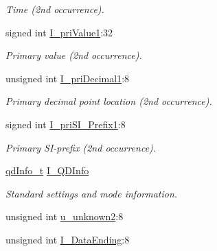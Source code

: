 \begin{DoxyCompactItemize}
\begin{DoxyCompactList}\small\item\em Time (2nd occurrence). \item\end{DoxyCompactList}\item 
\hypertarget{structFluke_1_1Fluke189_1_1qd4__set__t_a60568fea5707cef9782a1506a18ecc7a}{
signed int \hyperlink{structFluke_1_1Fluke189_1_1qd4__set__t_a60568fea5707cef9782a1506a18ecc7a}{I\_\-priValue1}:32}
\label{structFluke_1_1Fluke189_1_1qd4__set__t_a60568fea5707cef9782a1506a18ecc7a}

\begin{DoxyCompactList}\small\item\em Primary value (2nd occurrence). \item\end{DoxyCompactList}\item 
\hypertarget{structFluke_1_1Fluke189_1_1qd4__set__t_a9d41acc560b8a0217f14376b4a315014}{
unsigned int \hyperlink{structFluke_1_1Fluke189_1_1qd4__set__t_a9d41acc560b8a0217f14376b4a315014}{I\_\-priDecimal1}:8}
\label{structFluke_1_1Fluke189_1_1qd4__set__t_a9d41acc560b8a0217f14376b4a315014}

\begin{DoxyCompactList}\small\item\em Primary decimal point location (2nd occurrence). \item\end{DoxyCompactList}\item 
\hypertarget{structFluke_1_1Fluke189_1_1qd4__set__t_a8f0fcb678d3912ca366b8779eb39b22d}{
signed int \hyperlink{structFluke_1_1Fluke189_1_1qd4__set__t_a8f0fcb678d3912ca366b8779eb39b22d}{I\_\-priSI\_\-Prefix1}:8}
\label{structFluke_1_1Fluke189_1_1qd4__set__t_a8f0fcb678d3912ca366b8779eb39b22d}

\begin{DoxyCompactList}\small\item\em Primary SI-\/prefix (2nd occurrence). \item\end{DoxyCompactList}\item 
\hypertarget{structFluke_1_1Fluke189_1_1qd4__set__t_acfe06a8a79a95b251f766d2408a60fb6}{
\hyperlink{structFluke_1_1Fluke189_1_1qdInfo__t}{qdInfo\_\-t} \hyperlink{structFluke_1_1Fluke189_1_1qd4__set__t_acfe06a8a79a95b251f766d2408a60fb6}{I\_\-QDInfo}}
\label{structFluke_1_1Fluke189_1_1qd4__set__t_acfe06a8a79a95b251f766d2408a60fb6}

\begin{DoxyCompactList}\small\item\em Standard settings and mode information. \item\end{DoxyCompactList}\item 
unsigned int \hyperlink{structFluke_1_1Fluke189_1_1qd4__set__t_a7ac5798f6713dc4b811b2388d9374c74}{u\_\-unknown2}:8
\item 
unsigned int \hyperlink{structFluke_1_1Fluke189_1_1qd4__set__t_a08bcc1ec254053f32250beb7ae3e7219}{I\_\-DataEnding}:8
\end{DoxyCompactItemize}



